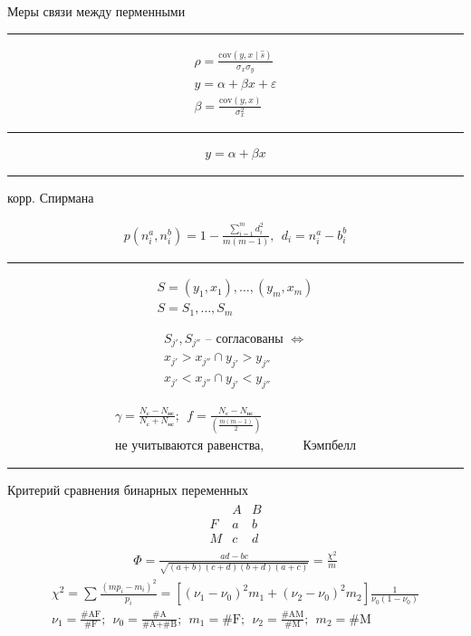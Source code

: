\documentclass{book}
\begin{document}
Меры связи между перменными
\hrule

\begin{gather*}
\rho=\frac{\mathrm{cov}(y,x\mid \hat{s})}{\sigma_x \sigma_y}\\
y=\alpha+\beta x+\varepsilon\\
\beta=\frac{\mathrm{cov}(y,x)}{\sigma_x^2}
\end{gather*}

\hrule

 \begin{gather*}
  y=\alpha+\beta x
\end{gather*}
\hrule

корр. Спирмана

\begin{gather*}
  p(n_i^a, n_i^b)=1-\frac{\sum_{i=1}^{m} {d_i^2}}{m(m-1)},~~d_i=n_i^a-b_i^{b}
\end{gather*}

\hrule
\begin{gather*}
    S={(y_1,x_1),\dots,(y_m,x_m)}\\
    S={S_1,\dots,S_m}
\end{gather*}

\begin{gather*}
    S_{j'}, S_{j''} \textrm{ -- согласованы } \Leftrightarrow\\
    x_{j'}>x_{j''} \cap y_{j'}>y_{j''}\\
    x_{j'}<x_{j''} \cap y_{j'}<y_{j''}
\end{gather*}

\begin{gather*}
  \gamma = \frac{N_\textrm{с}-N_\textrm{нс}}{N_\textrm{с}+N_\textrm{нс}};~~
  f=\frac{N_\textrm{с}-N_\textrm{нс}}{\left(\frac{m(m-1)}{2}\right)}\\
  \textrm{не учитываются равенства}, ~~~~~~~~~~~~~~\textrm{Кэмпбелл}
\end{gather*}
\hrule

Критерий сравнения бинарных переменных
\begin{gather*}
  \begin{matrix}
      &A&B\\
      F&a&b\\
      M&c&d
  \end{matrix}
\end{gather*}
\begin{gather*}
  \Phi = \frac{ad-bc}{\sqrt{(a+b)(c+d)(b+d)(a+c)}}=\frac{\chi^2}{m}
\end{gather*}
\begin{gather*}
    \chi^2=\sum_{}^{} {\frac{(mp_i-m_i)^2}{p_i}}
    =[(\nu_1-\nu_0)^2m_1+(\nu_2-\nu_0)^2m_2]\frac{1}{\nu_0(1-\nu_0)}\\
    \nu_1=\frac{\textrm{\#AF}}{\textrm{\#F}};~~
    \nu_0=\frac{\textrm{\#A}}{\textrm{\#A}+\textrm{\#B}};~~
    m_1=\textrm{\#F};~~
    \nu_2=\frac{\textrm{\#AM}}{\textrm{\#M}};~~
    m_2=\textrm{\#M}
\end{gather*}
\end{document}
